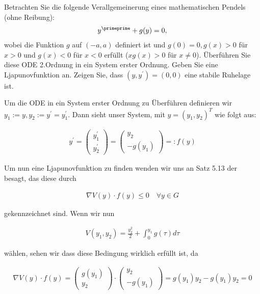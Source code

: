 \begin{exercise}
Betrachten Sie die folgende Verallgemeinerung eines mathematischen Pendels (ohne Reibung):
\begin{align*}
  y^{\primeprime} + g(y) = 0,
\end{align*}
wobei die Funktion $g$ auf $(-a,a)$ definiert ist und $g(0) = 0, g(x) > 0$ für $x > 0$
und $g(x) < 0$ für $x < 0$ erfüllt ($xg(x) > 0$ für $x \neq 0$). Überführen Sie
diese ODE 2.Ordnung in ein System erster Ordnung. Geben Sie eine Ljapunovfunktion
an. Zeigen Sie, dass $(y,y^{\prime}) = (0,0)$ eine stabile Ruhelage ist.
\end{exercise}
\begin{solution}
Um die ODE in ein System erster Ordnung zu Überführen definieren wir $y_1:=y,
y_2:= y^\prime = y_1^\prime$. Dann sieht unser System, mit $y= (y_1,y_2)^T$ wie folgt aus:

\begin{align*}
  y^\prime = \left(
  \begin{array}{c}
    y_1^\prime \\
    y_2^\prime
  \end{array}
  \right) = \left(
  \begin{array}{c}
    y_2 \\
    -g(y_1)
  \end{array}
  \right) =: f(y)
\end{align*}

Um nun eine Ljapunovfunktion zu finden wenden wir uns an Satz 5.13 der besagt, das diese
durch

\begin{align*}
  \nabla V(y) \cdot f(y) \leq 0 \quad \forall y \in G
\end{align*}

gekennzeichnet sind. Wenn wir nun

\begin{align*}
  V(y_1,y_2) = \frac{y_2^2}{2} + \int_0^{y_1}g(\tau)d\tau
\end{align*}

wählen, sehen wir dass diese Bedingung wirklich erfüllt ist, da

\begin{align*}
  \nabla V(y) \cdot f(y) = \left(
  \begin{array}{c}
    g(y_1)\\
    y_2
  \end{array}
  \right)
  \cdot \left(
  \begin{array}{c}
   y_2 \\
  -g(y_1)
  \end{array}
  \right) = g(y_1) y_2 - g(y_1) y_2 = 0
\end{align*}


\end{solution}
